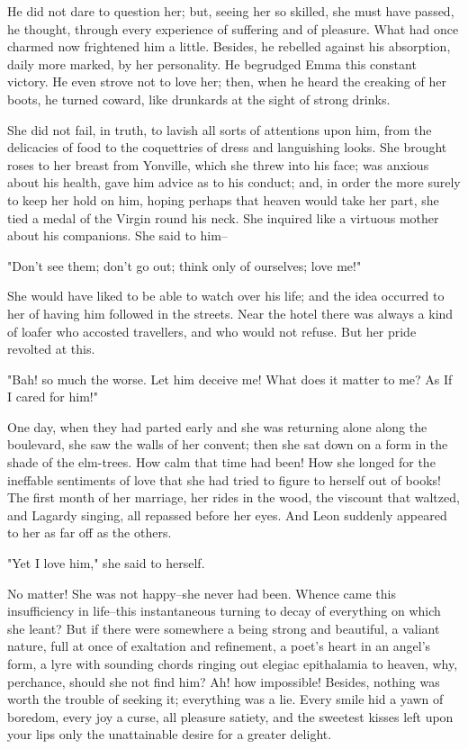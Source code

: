 \documentclass[11pt,twocolumn]{ltugboat}
\begin{document}
He did not dare to question her; but, seeing her so skilled, she must
have passed, he thought, through every experience of suffering and of
pleasure. What had once charmed now frightened him a little. Besides, he
rebelled against his absorption, daily more marked, by her personality.
He begrudged Emma this constant victory. He even strove not to love her;
then, when he heard the creaking of her boots, he turned coward, like
drunkards at the sight of strong drinks.

She did not fail, in truth, to lavish all sorts of attentions upon him,
from the delicacies of food to the coquettries of dress and languishing
looks. She brought roses to her breast from Yonville, which she threw
into his face; was anxious about his health, gave him advice as to his
conduct; and, in order the more surely to keep her hold on him, hoping
perhaps that heaven would take her part, she tied a medal of the
Virgin round his neck. She inquired like a virtuous mother about his
companions. She said to him--

"Don't see them; don't go out; think only of ourselves; love me!"

She would have liked to be able to watch over his life; and the idea
occurred to her of having him followed in the streets. Near the hotel
there was always a kind of loafer who accosted travellers, and who would
not refuse. But her pride revolted at this.

"Bah! so much the worse. Let him deceive me! What does it matter to me?
As If I cared for him!"

One day, when they had parted early and she was returning alone along
the boulevard, she saw the walls of her convent; then she sat down on a
form in the shade of the elm-trees. How calm that time had been! How she
longed for the ineffable sentiments of love that she had tried to figure
to herself out of books! The first month of her marriage, her rides in
the wood, the viscount that waltzed, and Lagardy singing, all repassed
before her eyes. And Leon suddenly appeared to her as far off as the
others.

"Yet I love him," she said to herself.

No matter! She was not happy--she never had been. Whence came this
insufficiency in life--this instantaneous turning to decay of everything
on which she leant? But if there were somewhere a being strong and
beautiful, a valiant nature, full at once of exaltation and refinement,
a poet's heart in an angel's form, a lyre with sounding chords ringing
out elegiac epithalamia to heaven, why, perchance, should she not find
him? Ah! how impossible! Besides, nothing was worth the trouble of
seeking it; everything was a lie. Every smile hid a yawn of boredom,
every joy a curse, all pleasure satiety, and the sweetest kisses left
upon your lips only the unattainable desire for a greater delight.
\end{document}
